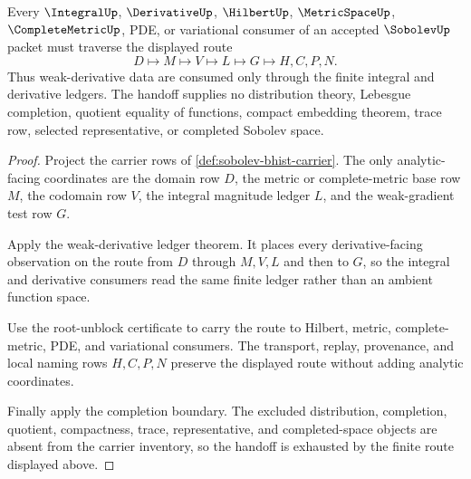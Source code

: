 \begin{theorem}
\label{thm:sobolev-integral-derivative-handoff}
Every $\IntegralUp$, $\DerivativeUp$, $\HilbertUp$, $\MetricSpaceUp$, $\CompleteMetricUp$, PDE, or variational consumer of an accepted $\SobolevUp$ packet must traverse the displayed route
$$
D \longmapsto M \longmapsto V \longmapsto L \longmapsto G \longmapsto H,C,P,N .
$$
Thus weak-derivative data are consumed only through the finite integral and derivative ledgers. The handoff supplies no distribution theory, Lebesgue completion, quotient equality of functions, compact embedding theorem, trace row, selected representative, or completed Sobolev space.
\end{theorem}
\begin{proof}
Project the carrier rows of \autoref{def:sobolev-bhist-carrier}. The only analytic-facing coordinates are the domain row $D$, the metric or complete-metric base row $M$, the codomain row $V$, the integral magnitude ledger $L$, and the weak-gradient test row $G$.

Apply the weak-derivative ledger theorem. It places every derivative-facing observation on the route from $D$ through $M,V,L$ and then to $G$, so the integral and derivative consumers read the same finite ledger rather than an ambient function space.

Use the root-unblock certificate to carry the route to Hilbert, metric, complete-metric, PDE, and variational consumers. The transport, replay, provenance, and local naming rows $H,C,P,N$ preserve the displayed route without adding analytic coordinates.

Finally apply the completion boundary. The excluded distribution, completion, quotient, compactness, trace, representative, and completed-space objects are absent from the carrier inventory, so the handoff is exhausted by the finite route displayed above.
\end{proof}

